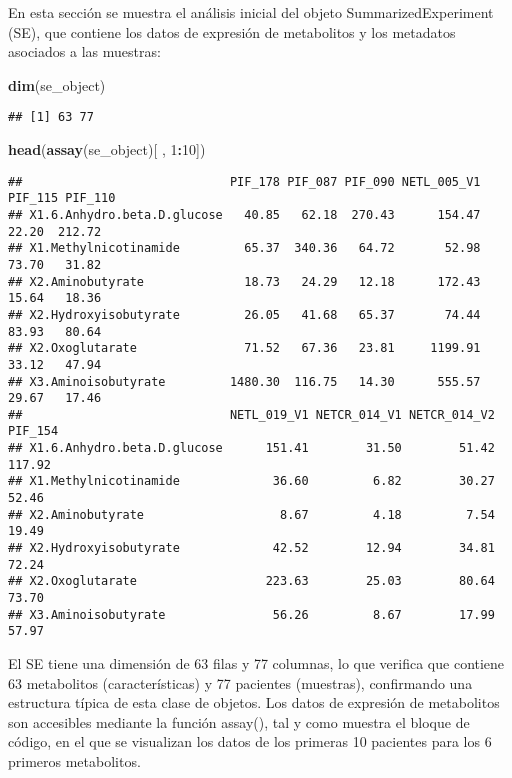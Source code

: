 \documentclass[
]{article}
\newenvironment{Shaded}{\begin{snugshade}}{\end{snugshade}}
\newcommand{\DecValTok}[1]{\textcolor[rgb]{0.00,0.00,0.81}{#1}}
\newcommand{\FunctionTok}[1]{\textcolor[rgb]{0.13,0.29,0.53}{\textbf{#1}}}
\newcommand{\NormalTok}[1]{#1}
\newcommand{\SpecialCharTok}[1]{\textcolor[rgb]{0.81,0.36,0.00}{\textbf{#1}}}
\begin{document}
En esta sección se muestra el análisis inicial del objeto
SummarizedExperiment (SE), que contiene los datos de expresión de
metabolitos y los metadatos asociados a las muestras:

\begin{Shaded}
\begin{Highlighting}[]
\FunctionTok{dim}\NormalTok{(se\_object)}
\end{Highlighting}
\end{Shaded}

\begin{verbatim}
## [1] 63 77
\end{verbatim}

\begin{Shaded}
\begin{Highlighting}[]
\FunctionTok{head}\NormalTok{(}\FunctionTok{assay}\NormalTok{(se\_object)[ , }\DecValTok{1}\SpecialCharTok{:}\DecValTok{10}\NormalTok{])}
\end{Highlighting}
\end{Shaded}

\begin{verbatim}
##                             PIF_178 PIF_087 PIF_090 NETL_005_V1 PIF_115 PIF_110
## X1.6.Anhydro.beta.D.glucose   40.85   62.18  270.43      154.47   22.20  212.72
## X1.Methylnicotinamide         65.37  340.36   64.72       52.98   73.70   31.82
## X2.Aminobutyrate              18.73   24.29   12.18      172.43   15.64   18.36
## X2.Hydroxyisobutyrate         26.05   41.68   65.37       74.44   83.93   80.64
## X2.Oxoglutarate               71.52   67.36   23.81     1199.91   33.12   47.94
## X3.Aminoisobutyrate         1480.30  116.75   14.30      555.57   29.67   17.46
##                             NETL_019_V1 NETCR_014_V1 NETCR_014_V2 PIF_154
## X1.6.Anhydro.beta.D.glucose      151.41        31.50        51.42  117.92
## X1.Methylnicotinamide             36.60         6.82        30.27   52.46
## X2.Aminobutyrate                   8.67         4.18         7.54   19.49
## X2.Hydroxyisobutyrate             42.52        12.94        34.81   72.24
## X2.Oxoglutarate                  223.63        25.03        80.64   73.70
## X3.Aminoisobutyrate               56.26         8.67        17.99   57.97
\end{verbatim}

El SE tiene una dimensión de 63 filas y 77 columnas, lo que verifica que
contiene 63 metabolitos (características) y 77 pacientes (muestras),
confirmando una estructura típica de esta clase de objetos. Los datos de
expresión de metabolitos son accesibles mediante la función assay(), tal
y como muestra el bloque de código, en el que se visualizan los datos de
los primeras 10 pacientes para los 6 primeros metabolitos.
\end{document}
